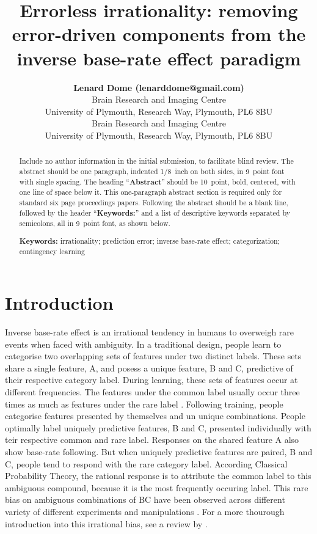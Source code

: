 \documentclass[10pt,letterpaper]{article}
\title{Errorless irrationality: removing error-driven components from the inverse base-rate effect paradigm}
\author{{\large \bf Lenard Dome (lenarddome@gmail.com)} \\
  Brain Research and Imaging Centre \\
  University of Plymouth, Research Way, Plymouth, PL6 8BU
  \AND {\large \bf Andy J. Wills (andy.wills@plymouth.ac.uk)} \\
  Brain Research and Imaging Centre \\
  University of Plymouth, Research Way, Plymouth, PL6 8BU}
\begin{document}
\maketitle

\begin{abstract}
Include no author information in the initial submission, to facilitate
blind review.  The abstract should be one paragraph, indented 1/8~inch on both sides,
in 9~point font with single spacing. The heading ``{\bf Abstract}''
should be 10~point, bold, centered, with one line of space below
it. This one-paragraph abstract section is required only for standard
six page proceedings papers. Following the abstract should be a blank
line, followed by the header ``{\bf Keywords:}'' and a list of
descriptive keywords separated by semicolons, all in 9~point font, as
shown below.

\textbf{Keywords:} 
irrationality; prediction error; inverse base-rate effect; categorization; contingency learning
\end{abstract}


\section{Introduction}

Inverse base-rate effect \cite<IBRE, >{medin1988problem} is an irrational tendency in humans to overweigh rare events when faced with ambiguity.
In a traditional design, people learn to categorise two overlapping sets of features under two distinct labels.
These sets share a single feature, A, and posess a unique feature, B and C, predictive of their respective category label.
During learning, these sets of features occur at different frequencies.
The features under the common label usually occur three times as much as features under the rare label \cite{kruschke1996base}.
Following training, people categorise features presented by themselves and un unique combinations.
People optimally label uniquely predictive features, B and C, presented individually with teir respective common and rare label.
Responses on the shared feature A also show base-rate following.
But when uniquely predictive features are paired, B and C, people tend to respond with the rare category label.
According Classical Probability Theory, the rational response is to attribute the common label to this ambiguous compound, because it is the most frequently occuring label.
This rare bias on ambiguous combinations of BC have been observed across different variety of different experiments and manipulations \cite{kalish2001inverse,don2017effects,don2017effects,inkster2022effect,wills2014attention}.
For a more thourough introduction into this irrational bias, see a review by .
\end{document}
